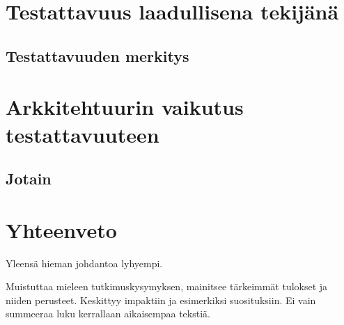 \documentclass[finnish]{tktltiki2}
\theoremstyle{definition}
\theoremstyle{remark}
\begin{document}
\section{Testattavuus laadullisena tekijänä}
\subsection{Testattavuuden merkitys}

\section{Arkkitehtuurin vaikutus testattavuuteen}
\subsection{Jotain}


\section{Yhteenveto}


Yleensä hieman johdantoa lyhyempi.

Muistuttaa mieleen tutkimuskysymyksen, mainitsee tärkeimmät tulokset ja niiden perusteet. Keskittyy impaktiin ja esimerkiksi suosituksiin. Ei vain summeeraa luku kerrallaan aikaisempaa tekstiä.



%
%
% 
%


%





% 
\end{document}
